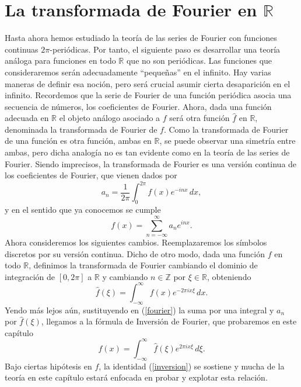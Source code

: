 \documentclass[12pt]{article}
\newcommand{\R}{\mathbb{R}}
\newcommand{\Z}{\mathbb{Z}}
\theoremstyle{plain}
\theoremstyle{definition}
\numberwithin{equation}{section}
\begin{document}
\section{La transformada de Fourier en \texorpdfstring{\(\mathbb{R}\)}{R}}
    Hasta ahora hemos estudiado la teoría de las series de Fourier con funciones continuas \(2\pi\)-periódicas. Por tanto, el siguiente paso es desarrollar una teoría análoga para funciones en todo \(\R\) que no son periódicas.
    Las funciones que consideraremos serán adecuadamente ``pequeñas'' en el infinito. Hay varias maneras de definir esa noción, pero será crucial asumir cierta desaparición en el infinito.
        Recordemos que la serie de Fourier de una función periódica asocia una secuencia de números, los coeficientes de Fourier. Ahora, dada una función adecuada en \(\R\) el objeto análogo asociado a \(f\) será otra función \(\hat{f} \) en \(\R\), denominada la transformada de Fourier de \(f\). Como la transformada de Fourier de una función es otra función, ambas en \(\R\), se puede observar una simetría entre ambas, pero dicha analogía no es tan evidente como en la teoría de las series de Fourier.
        Siendo imprecisos, la transformada de Fourier es una versión continua de los coeficientes de Fourier, que vienen dados por
        $$ a_n = \frac{1}{2\pi} \int_{0}^{2\pi} f(x)e^{-inx} \,dx, $$ y en el sentido que ya conocemos se cumple
        \begin{equation}
            \label{fourier}
            f(x) = \sum_{n = -\infty}^{\infty} a_ne^{inx}.
        \end{equation}
        Ahora consideremos los siguientes cambios. Reemplazaremos los símbolos discretos por su versión continua. Dicho de otro modo, dada una función \(f\) en todo \( \R \), definimos la transformada de Fourier cambiando el dominio de integración de \([0,2\pi]\) a \(\R\) y cambiando \(n \in \Z \) por \(\xi \in \R\), obteniendo
        \begin{equation*}
            \hat{f}(\xi) =  \int_{-\infty}^{\infty} f(x)e^{-2\pi ix\xi}\,dx.
        \end{equation*}
        Yendo más lejos aún, sustituyendo en (\ref{fourier}) la suma por una integral y \(a_n\) por \(\hat{f}(\xi)\), llegamos a la fórmula de Inversión de Fourier, que probaremos en este capítulo
        \begin{equation}
            \label{inversion}
            f(x) = \int_{-\infty}^{\infty} \hat{f}(\xi)e^{2\pi ix\xi}\,d\xi.
        \end{equation}
        Bajo ciertas hipótesis en \(f\), la identidad (\ref{inversion}) se sostiene y mucha de la teoría en este capítulo estará enfocada en probar y explotar esta relación.
\end{document}
